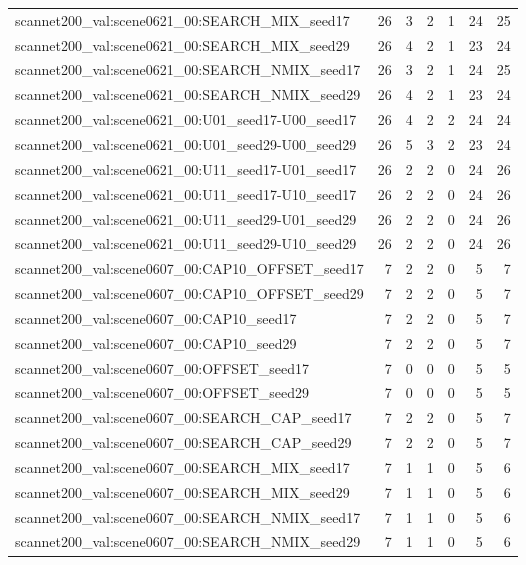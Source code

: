 \begin{table}[t]
\begin{tabular}{lrrrrrr}
scannet200\_val:scene0621\_00:SEARCH\_MIX\_seed17 & 26 & 3 & 2 & 1 & 24 & 25 \\
scannet200\_val:scene0621\_00:SEARCH\_MIX\_seed29 & 26 & 4 & 2 & 1 & 23 & 24 \\
scannet200\_val:scene0621\_00:SEARCH\_NMIX\_seed17 & 26 & 3 & 2 & 1 & 24 & 25 \\
scannet200\_val:scene0621\_00:SEARCH\_NMIX\_seed29 & 26 & 4 & 2 & 1 & 23 & 24 \\
scannet200\_val:scene0621\_00:U01\_seed17-U00\_seed17 & 26 & 4 & 2 & 2 & 24 & 24 \\
scannet200\_val:scene0621\_00:U01\_seed29-U00\_seed29 & 26 & 5 & 3 & 2 & 23 & 24 \\
scannet200\_val:scene0621\_00:U11\_seed17-U01\_seed17 & 26 & 2 & 2 & 0 & 24 & 26 \\
scannet200\_val:scene0621\_00:U11\_seed17-U10\_seed17 & 26 & 2 & 2 & 0 & 24 & 26 \\
scannet200\_val:scene0621\_00:U11\_seed29-U01\_seed29 & 26 & 2 & 2 & 0 & 24 & 26 \\
scannet200\_val:scene0621\_00:U11\_seed29-U10\_seed29 & 26 & 2 & 2 & 0 & 24 & 26 \\
scannet200\_val:scene0607\_00:CAP10\_OFFSET\_seed17 & 7 & 2 & 2 & 0 & 5 & 7 \\
scannet200\_val:scene0607\_00:CAP10\_OFFSET\_seed29 & 7 & 2 & 2 & 0 & 5 & 7 \\
scannet200\_val:scene0607\_00:CAP10\_seed17 & 7 & 2 & 2 & 0 & 5 & 7 \\
scannet200\_val:scene0607\_00:CAP10\_seed29 & 7 & 2 & 2 & 0 & 5 & 7 \\
scannet200\_val:scene0607\_00:OFFSET\_seed17 & 7 & 0 & 0 & 0 & 5 & 5 \\
scannet200\_val:scene0607\_00:OFFSET\_seed29 & 7 & 0 & 0 & 0 & 5 & 5 \\
scannet200\_val:scene0607\_00:SEARCH\_CAP\_seed17 & 7 & 2 & 2 & 0 & 5 & 7 \\
scannet200\_val:scene0607\_00:SEARCH\_CAP\_seed29 & 7 & 2 & 2 & 0 & 5 & 7 \\
scannet200\_val:scene0607\_00:SEARCH\_MIX\_seed17 & 7 & 1 & 1 & 0 & 5 & 6 \\
scannet200\_val:scene0607\_00:SEARCH\_MIX\_seed29 & 7 & 1 & 1 & 0 & 5 & 6 \\
scannet200\_val:scene0607\_00:SEARCH\_NMIX\_seed17 & 7 & 1 & 1 & 0 & 5 & 6 \\
scannet200\_val:scene0607\_00:SEARCH\_NMIX\_seed29 & 7 & 1 & 1 & 0 & 5 & 6 \\

\end{tabular}
\end{table}
